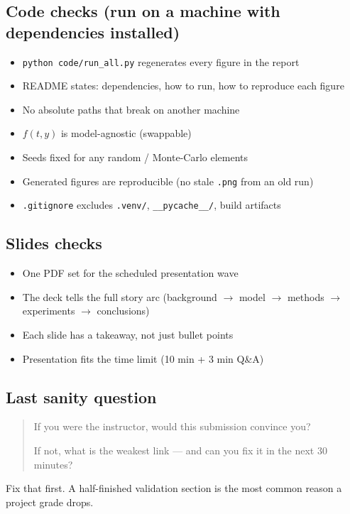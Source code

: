 \documentclass[11pt]{article}
\begin{document}
\subsection*{Code checks (run on a machine with dependencies installed)}
\begin{itemize}[leftmargin=2.4em, itemsep=1pt]
  \item[$\square$] \texttt{python code/run\_all.py} regenerates every figure in the report
  \item[$\square$] README states: dependencies, how to run, how to reproduce each figure
  \item[$\square$] No absolute paths that break on another machine
  \item[$\square$] $f(t, y)$ is model-agnostic (swappable)
  \item[$\square$] Seeds fixed for any random / Monte-Carlo elements
  \item[$\square$] Generated figures are reproducible (no stale \texttt{.png} from an old run)
  \item[$\square$] \texttt{.gitignore} excludes \texttt{.venv/}, \texttt{\_\_pycache\_\_/},
    build artifacts
\end{itemize}

\subsection*{Slides checks}
\begin{itemize}[leftmargin=2.4em, itemsep=1pt]
  \item[$\square$] One PDF set for the scheduled presentation wave
  \item[$\square$] The deck tells the full story arc (background $\to$ model $\to$ methods $\to$ experiments $\to$ conclusions)
  \item[$\square$] Each slide has a takeaway, not just bullet points
  \item[$\square$] Presentation fits the time limit (10 min + 3 min Q\&A)
\end{itemize}

\subsection*{Last sanity question}
\begin{quote}
If you were the instructor, would this submission convince you?

If not, what is the weakest link --- and can you fix it in the next 30 minutes?
\end{quote}
Fix that first. A half-finished validation section is the most common reason a
project grade drops.
\end{document}
